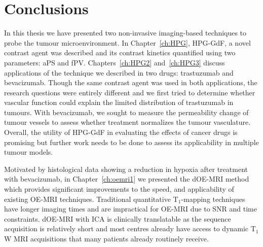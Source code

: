 
\section{Conclusions}

In this thesis we have presented two non-invasive imaging-based techniques to probe the tumour microenvironment.
In Chapter~\ref{ch:HPG}, \acs{HPG-GdF}, a novel contrast agent was described and its contrast kinetics quantified using two parameters: \acs{aPS} and \acs{fPV}. 
Chapters~\ref{ch:HPG2} and~\ref{ch:HPG3} discuss applications of the technique we described in two drugs: trastuzumab and bevacizumab. 
Though the same contrast agent was used in both applications, the research questions were entirely different and we first tried to determine whether vascular function could explain the limited distribution of trastuzumab in tumours.
With bevacizumab, we sought to measure the permeability change of tumour vessels to assess whether treatment normalizes the tumour vasculature.
Overall, the utility of \acs{HPG-GdF} in evaluating the effects of cancer drugs is promising but further work needs to be done to assess its applicability in multiple tumour models.

Motivated by histological data showing a reduction in hypoxia after treatment with bevacizumab, in Chapter~\ref{ch:oemri1} we presented the \acs{dOE-MRI} method which provides significant improvements to the speed, and applicability of existing \acs{OE-MRI} techniques. 
Traditional quantitative T$_1$-mapping techniques have longer imaging times and are impractical for \acs{OE-MRI} due to \acs{SNR} and time constraints.
\acs{dOE-MRI} with \acs{ICA} is clinically translatable as the sequence acquisition is relatively short and most centres already have access to dynamic T$_1$W MRI acquisitions that many patients already routinely receive. 

